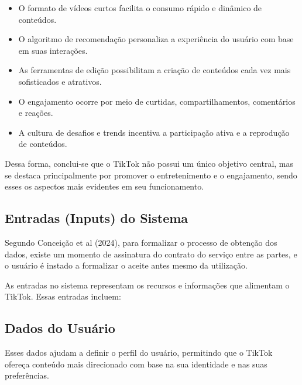 \begin{itemize}
    \item O formato de vídeos curtos facilita o consumo rápido e dinâmico de conteúdos.
    \item O algoritmo de recomendação personaliza a experiência do usuário com base em suas interações.
    \item As ferramentas de edição possibilitam a criação de conteúdos cada vez mais sofisticados e atrativos.
    \item O engajamento ocorre por meio de curtidas, compartilhamentos, comentários e reações.
     \item A cultura de desafios e trends incentiva a participação ativa e a reprodução de conteúdos.
\end{itemize}


Dessa forma, conclui-se que o TikTok não possui um único objetivo central, mas se destaca principalmente por promover o entretenimento e o engajamento, sendo esses os aspectos mais evidentes em seu funcionamento.

\newpage
\subsection{Entradas (Inputs) do Sistema}

Segundo Conceição et al (2024), para formalizar o processo de obtenção dos dados, existe um momento de assinatura do contrato do serviço entre as partes, e o usuário é instado a formalizar o aceite antes mesmo da utilização.\vskip0.3cm


As entradas no sistema representam os recursos e informações que alimentam o TikTok. Essas entradas incluem:


\subsection{Dados do Usuário}

Esses dados ajudam a definir o perfil do usuário, permitindo que o TikTok ofereça conteúdo mais direcionado com base na sua identidade e nas suas preferências. 

